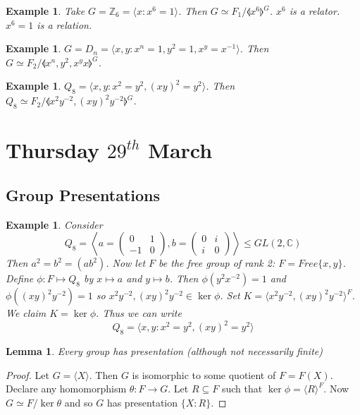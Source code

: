 \documentclass[a4paper,10pt]{article}
\newcommand{\CC}{\mathbb{C}}
\newcommand{\ZZ}{\mathbb{Z}}
\newtheorem{eg}[thm]{Example}
\newtheorem{Lem}[thm]{Lemma}
\begin{document}
\begin{eg}
Take $G = \ZZ_6 = \langle x : x^6 = 1\rangle$. Then $G \simeq F_1 / \llangle x^6 \rrangle^G$. $x^6$ is a relator. $x^6 = 1$ is a relation.
\end{eg}

\begin{eg}
$G = D_n = \langle x,y : x^n = 1, y^2 = 1, x^y = x^{-1} \rangle$. Then $G \simeq F_2 / \llangle x^n, y^2, x^y x \rrangle^G$.
\end{eg}

\begin{eg}
$Q_8 = \langle x,y : x^2 = y^2, (xy)^2 = y^2 \rangle$. Then $Q_8 \simeq F_2 / \llangle x^2y^{-2}, (xy)^2y^{-2} \rrangle^G$. 
\end{eg}





\newpage
\section{Thursday $29^{th}$ March}

\subsection{Group Presentations}
\begin{eg}
Consider 
\[ Q_8 = \left\langle a = \begin{pmatrix} 0 & 1 \\ -1 & 0 \end{pmatrix}, b = \begin{pmatrix} 0 & i \\ i & 0 \end{pmatrix} \right\rangle \leq GL(2,\CC) \]
Then $a^2 = b^2 = (ab^2)$. Now let $F$ be the free group of rank 2: $F = Free\{ x, y\}$. Define $\phi: F \mapsto Q_8$ by $x \mapsto a$ and $y \mapsto b$. Then $\phi( y^2x^{-2}) = 1$ and $\phi( (xy)^2y^{-2}) = 1$ so $x^2y^{-2}, (xy)^2y^{-2} \in \ker \phi$. Set $K = \langle x^2y^{-2}, (xy)^2y^{-2} \rangle^F$. We claim $K = \ker \phi$. Thus we can write 
\[ Q_8 = \langle x,y : x^2 = y^2, (xy)^2 = y^2 \rangle \]
\end{eg}

\begin{Lem}
Every group has presentation (although not necessarily finite) 
\end{Lem}

\begin{proof}
Let $G = \langle X \rangle$. Then $G$ is isomorphic to some quotient of $F = F(X)$. Declare any homomorphism $\theta : F \rightarrow G$. Let $R \subseteq F$ such that $\ker \phi = \langle R \rangle^F$. Now $G \simeq F / \ker \theta$ and so $G$ has presentation $\{ X : R \}$. 
\end{proof}
\end{document}
